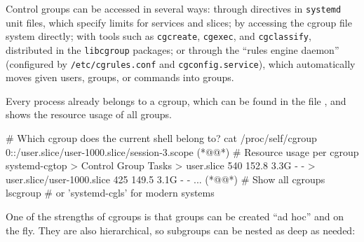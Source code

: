 Control groups can be accessed in several ways: through directives in \texttt{systemd} unit files, which specify limits for services and slices; by accessing the cgroup file system directly; with tools such as \texttt{cgcreate}, \texttt{cgexec}, and \texttt{cgclassify}, distributed in the \texttt{libcgroup} packages; or through the ``rules engine daemon'' (configured by \texttt{/etc/cgrules.conf} and \texttt{cgconfig.service}), which automatically moves given users, groups, or commands into groups.

\begin{exampleblock}
    Every process already belongs to a cgroup, which can be found in the file , and  shows the resource usage of all groups.

    \vspace{-0.5em}

    \begin{codeblock}[language=bash, escapeinside={(*@}{@*)}]
# Which cgroup does the current shell belong to?
cat /proc/self/cgroup
0::/user.slice/user-1000.slice/session-3.scope (*@\vspace{1em}@*)
# Resource usage per cgroup
systemd-cgtop
> Control Group              Tasks  %
> user.slice                   540  152.8    3.3G        -        -
> user.slice/user-1000.slice   425  149.5    3.1G        -        -
... (*@\vspace{1em}@*)
# Show all cgroups
lscgroup        # or 'systemd-cgls' for modern systems
    \end{codeblock}
\end{exampleblock}

One of the strengths of cgroups is that groups can be created ``ad hoc'' and on the fly. They are also hierarchical, so subgroups can be nested as deep as needed:


